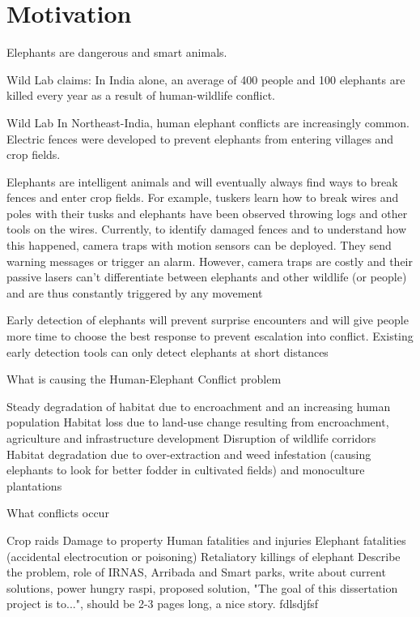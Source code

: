\section{ Motivation}

Elephants are dangerous and smart animals.\cite{scientificelephant}

Wild Lab claims:\cite{knuthwebsite}
In India alone, an average of 400 people and 100 elephants are killed every year as a result of human-wildlife conflict. 

Wild Lab
In Northeast-India, human elephant conflicts are increasingly common. Electric fences were developed to prevent elephants from entering villages and crop fields.

Elephants are intelligent animals and will eventually always find ways to break fences and enter crop fields. For example, tuskers learn how to break wires and poles with their tusks and elephants have been observed throwing logs and other tools on the wires.  Currently, to identify damaged fences and to understand how this happened, camera traps with motion sensors can be deployed. They send warning messages or trigger an alarm. However, camera traps are costly and their passive lasers can’t differentiate between elephants and other wildlife (or people) and are thus constantly triggered by any movement

Early detection of elephants will prevent surprise encounters and will give people more time to choose the best response to prevent escalation into conflict. Existing early detection tools can only detect elephants at short distances


What is causing the Human-Elephant Conflict problem

    Steady degradation of habitat due to encroachment and an increasing human population
    Habitat loss due to land-use change resulting from encroachment, agriculture and infrastructure development
    Disruption of wildlife corridors
    Habitat degradation due to over-extraction and weed infestation (causing elephants to look for better fodder in cultivated fields) and monoculture plantations

What conflicts occur

    Crop raids
    Damage to property
    Human fatalities and injuries
    Elephant fatalities (accidental electrocution or poisoning)
    Retaliatory killings of elephant
        Describe the problem, role of IRNAS, Arribada and Smart parks, write about current solutions, power hungry raspi, proposed solution, "The goal of this dissertation project is to...", should be 2-3 pages long, a nice story.
fdlsdjfsf
